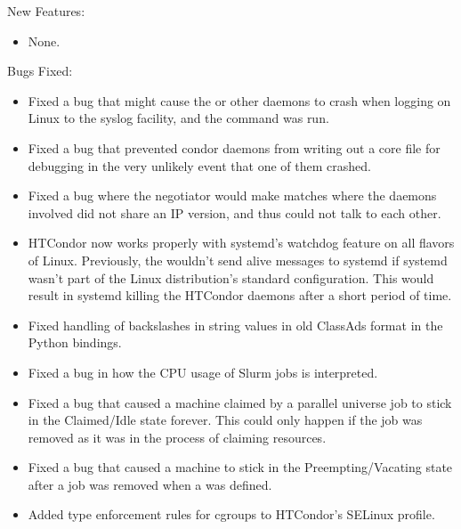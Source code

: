\noindent New Features:

\begin{itemize}

\item None.

\end{itemize}

\noindent Bugs Fixed:

\begin{itemize}

\item Fixed a bug that might cause the  or other daemons to
crash when logging on Linux to the syslog facility, and the 
command was run.

\item Fixed a bug that prevented condor daemons from writing out a
core file for debugging in the very unlikely event that one of them
crashed.

\item Fixed a bug where the negotiator would make matches where the daemons
involved did not share an IP version, and thus could not talk to each other.

\item HTCondor now works properly with systemd's watchdog feature on
all flavors of Linux.
Previously, the  wouldn't send alive messages to systemd
if systemd wasn't part of the Linux distribution's standard configuration.
This would result in systemd killing the HTCondor daemons after a
short period of time.

\item Fixed handling of backslashes in string values in old ClassAds
format in the Python bindings.

\item Fixed a bug in how the CPU usage of Slurm jobs is interpreted.

\item Fixed a bug that caused a machine claimed by a parallel universe
job to stick in the Claimed/Idle state forever.  This could only happen
if the job was removed as it was in the process of claiming resources.

\item Fixed a bug that caused a machine to stick in the
Preempting/Vacating state after a job was removed
when a  was defined.

\item Added type enforcement rules for cgroups to HTCondor's SELinux
profile.


\end{itemize}
